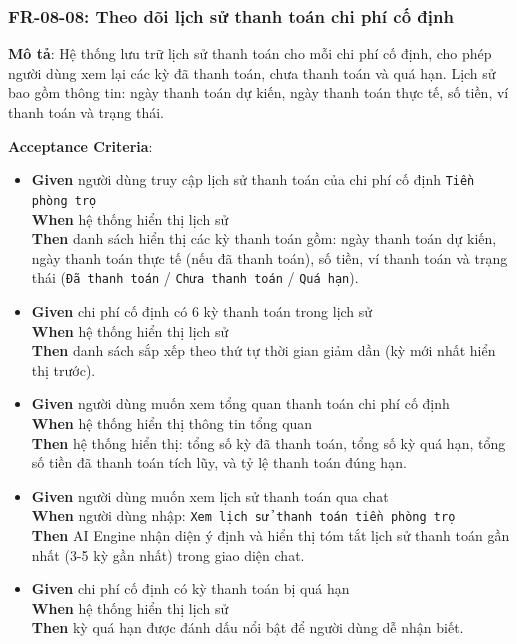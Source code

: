 \subsubsection{FR-08-08: Theo dõi lịch sử thanh toán chi phí cố định}

\textbf{Mô tả}: Hệ thống lưu trữ lịch sử thanh toán cho mỗi chi phí cố định, cho phép người dùng xem lại các kỳ đã thanh toán, chưa thanh toán và quá hạn. Lịch sử bao gồm thông tin: ngày thanh toán dự kiến, ngày thanh toán thực tế, số tiền, ví thanh toán và trạng thái.



\textbf{Acceptance Criteria}:

\begin{itemize}
\item \textbf{Given} người dùng truy cập lịch sử thanh toán của chi phí cố định \texttt{Tiền phòng trọ}  \\ \hspace*{1.5em}  \textbf{When} hệ thống hiển thị lịch sử  \\ \hspace*{1.5em}  \textbf{Then} danh sách hiển thị các kỳ thanh toán gồm: ngày thanh toán dự kiến, ngày thanh toán thực tế (nếu đã thanh toán), số tiền, ví thanh toán và trạng thái (\texttt{Đã thanh toán} / \texttt{Chưa thanh toán} / \texttt{Quá hạn}).
\item \textbf{Given} chi phí cố định có 6 kỳ thanh toán trong lịch sử  \\ \hspace*{1.5em}  \textbf{When} hệ thống hiển thị lịch sử  \\ \hspace*{1.5em}  \textbf{Then} danh sách sắp xếp theo thứ tự thời gian giảm dần (kỳ mới nhất hiển thị trước).
\item \textbf{Given} người dùng muốn xem tổng quan thanh toán chi phí cố định  \\ \hspace*{1.5em}  \textbf{When} hệ thống hiển thị thông tin tổng quan  \\ \hspace*{1.5em}  \textbf{Then} hệ thống hiển thị: tổng số kỳ đã thanh toán, tổng số kỳ quá hạn, tổng số tiền đã thanh toán tích lũy, và tỷ lệ thanh toán đúng hạn.
\item \textbf{Given} người dùng muốn xem lịch sử thanh toán qua chat  \\ \hspace*{1.5em}  \textbf{When} người dùng nhập: \texttt{Xem lịch sử thanh toán tiền phòng trọ}  \\ \hspace*{1.5em}  \textbf{Then} AI Engine nhận diện ý định và hiển thị tóm tắt lịch sử thanh toán gần nhất (3-5 kỳ gần nhất) trong giao diện chat.
\item \textbf{Given} chi phí cố định có kỳ thanh toán bị quá hạn  \\ \hspace*{1.5em}  \textbf{When} hệ thống hiển thị lịch sử  \\ \hspace*{1.5em}  \textbf{Then} kỳ quá hạn được đánh dấu nổi bật để người dùng dễ nhận biết.
\end{itemize}
